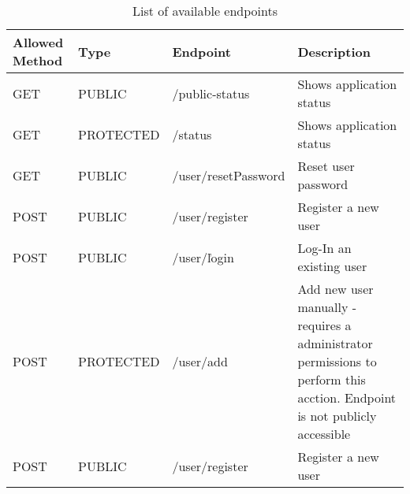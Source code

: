 \documentclass{article}
\begin{document}
\begin{table}[ht]
    \centering
    \begin{tabular}{|L{2cm}|L{2cm}|L{6cm}|L{6cm}|}
        \hline
        Allowed Method&Type&Endpoint&Description \\ \hline
        GET&PUBLIC&/public-status&Shows application status \\ \hline

        GET&PROTECTED&/status&Shows application status \\ \hline
        GET&PUBLIC&/user/resetPassword&Reset user password \\ \hline

        POST&PUBLIC&/user/register&Register a new user  \\ \hline
        POST&PUBLIC&/user/ľogin&Log-In an existing user \\ \hline
        POST&PROTECTED&/user/add&Add new user manually - requires a administrator permissions to perform this acction. Endpoint is not publicly accessible  \\ \hline
        POST&PUBLIC&/user/register&Register a new user  \\ \hline

    \end{tabular}
    \caption{List of available endpoints}
\end{table}
\end{document}
